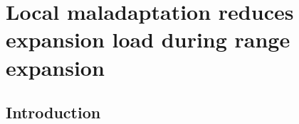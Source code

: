\chapter{Local maladaptation reduces expansion load during range expansion}
\label{chap:expansionload}






\section{Introduction}

